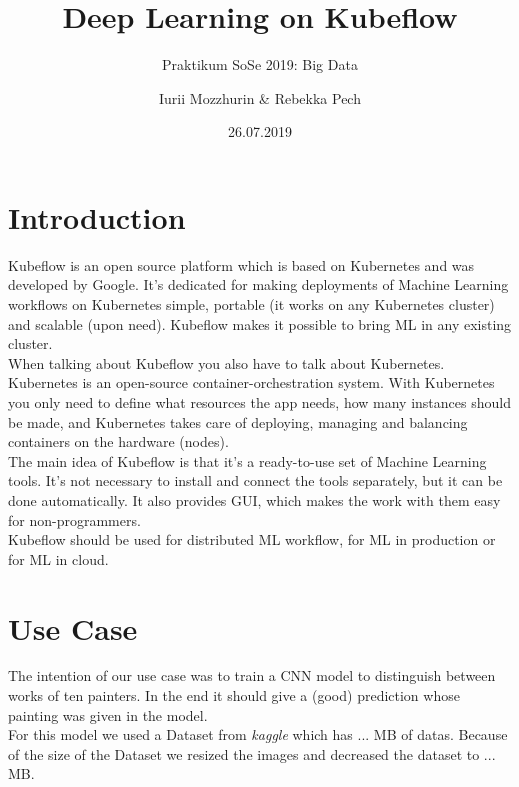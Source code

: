 \documentclass[12pt,a4paper]{scrartcl}		%
\begin{document}
\title{\LARGE Deep Learning on Kubeflow}
\subtitle{\large Praktikum SoSe 2019: Big Data}
\date{26.07.2019}
\author{ \large Iurii Mozzhurin \& Rebekka Pech}
\maketitle



\section{Introduction}

\noindent Kubeflow is an open source platform which is based on Kubernetes and was developed by Google. It's dedicated for making deployments of Machine Learning workflows on Kubernetes simple, portable (it works on any Kubernetes cluster) and scalable (upon need). Kubeflow makes it possible to bring ML in any existing cluster. \\

\noindent When talking about Kubeflow you also have to talk about Kubernetes. Kubernetes is an open-source container-orchestration system. With Kubernetes you only need to define what resources the app needs, how many instances should be made, and Kubernetes takes care of deploying, managing and balancing containers on the hardware (nodes).\\  

\noindent The main idea of Kubeflow is that it's a ready-to-use set of Machine Learning tools. It's not necessary to install and connect the tools separately, but it can be done automatically. It also provides GUI, which makes the work with them easy for non-programmers.\\
 Kubeflow should be used for distributed ML workflow, for ML in production or for ML in cloud.
\section{Use Case}

\noindent The intention of our use case was to train a CNN model to distinguish between works of ten painters. In the end it should give a (good) prediction whose painting was given in the model. \\
For this model we used a Dataset from \textit{kaggle} which has ... MB of datas. Because of the size of the Dataset we resized the images and decreased the dataset to ... MB.\\
\end{document}
